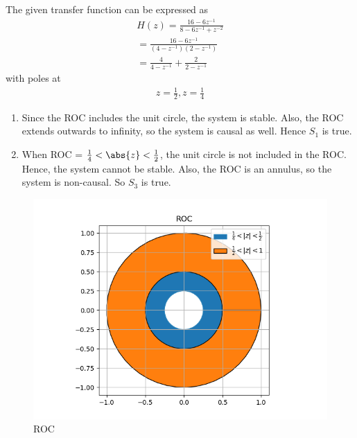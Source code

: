 The given transfer function can be expressed as
\begin{align}
    H(z) = \frac{16 - 6z^{-1}}{8 - 6z^{-1} + z^{-2}}\\
     = \frac{16 - 6z^{-1}}{(4 - z^{-1})(2 - {z^{-1}})}\\
      = \frac{4}{4 - z^{-1}} +\frac{2}{2 - z^{-1}}
       \label{partial-fraction}
\end{align}
%
with poles at
\begin{align}
z = \frac{1}{2}, z = \frac{1}{4}
\end{align}
\begin{enumerate}
\item   Since the ROC includes the unit circle, the system is stable.  Also, the ROC extends outwards to infinity, so the system is causal as well.  Hence $S_1$ is true.
\item  When ROC = $\frac{1}{4} < \abs{z} < \frac{1}{2}$,  the unit circle is not included in the ROC.  Hence, the system cannot be stable.  Also, the ROC is an annulus, so the system is non-causal.  So $S_3$ is true.
\end{enumerate}
 

\begin{figure}[!ht]
\centering
 \includegraphics[width=\columnwidth]{solutions/ec/2010/42/Graphs/ROC.png}
 \caption{ROC}
 \end{figure}
 
 